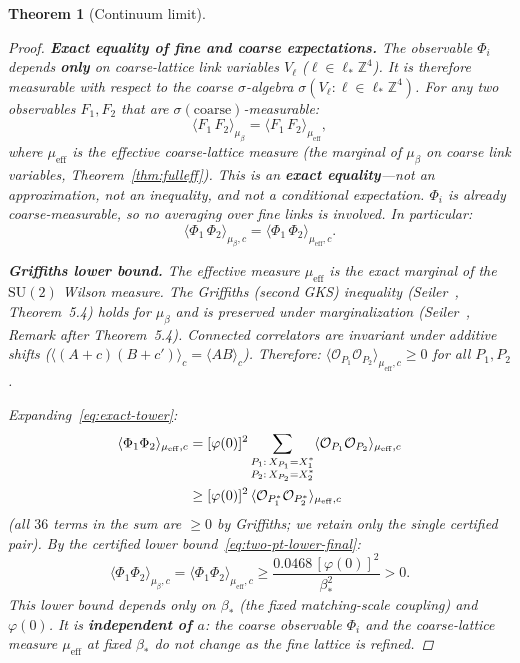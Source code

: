 \documentclass[11pt]{article}
\newtheorem{theorem}{Theorem}[section]
\theoremstyle{definition}
\newcommand{\SU}{\mathrm{SU}}
\newcommand{\Z}{\mathbb{Z}}
\begin{document}
\begin{theorem}[Continuum limit]
\begin{proof}
\textbf{Exact equality of fine and coarse expectations.}
The observable $\Phi_i$ depends \textbf{only} on
coarse-lattice link variables $V_\ell$
($\ell\in\ell_*\Z^4$).  It is therefore measurable with
respect to the coarse $\sigma$-algebra
$\sigma(V_\ell:\ell\in\ell_*\Z^4)$.
For any two observables $F_1,F_2$ that are
$\sigma(\text{coarse})$-measurable:
\begin{equation}\label{eq:coarse-measurable}
\langle F_1\,F_2\rangle_{\mu_\beta}
=\langle F_1\,F_2\rangle_{\mu_{\mathrm{eff}}},
\end{equation}
where $\mu_{\mathrm{eff}}$ is the effective coarse-lattice
measure (the marginal of $\mu_\beta$ on coarse link variables,
Theorem~\ref{thm:fulleff}).
This is an \textbf{exact equality}---not an approximation,
not an inequality, and not a conditional expectation.
$\Phi_i$ is already coarse-measurable, so no averaging
over fine links is involved.
In particular:
\begin{equation}\label{eq:exact-tower}
\langle\Phi_1\,\Phi_2\rangle_{\mu_\beta,c}
=\langle\Phi_1\,\Phi_2\rangle_{\mu_{\mathrm{eff}},c}.
\end{equation}

\textbf{Griffiths lower bound.}
The effective measure $\mu_{\mathrm{eff}}$ is the exact
marginal of the $\SU(2)$ Wilson measure.
The Griffiths (second GKS) inequality
(Seiler~\cite{Seiler82}, Theorem~5.4) holds for
$\mu_\beta$ and is preserved under
marginalization (Seiler~\cite{Seiler82}, Remark after
Theorem~5.4).  Connected correlators are invariant under
additive shifts ($\langle(A+c)(B+c')\rangle_c
=\langle AB\rangle_c$).  Therefore:
$\langle\mathcal{O}_{P_1}\mathcal{O}_{P_2}
\rangle_{\mu_{\mathrm{eff}},c}\ge 0$ for all $P_1,P_2$.

Expanding~\eqref{eq:exact-tower}:
\begin{align}
\langle\Phi_1\Phi_2\rangle_{\mu_{\mathrm{eff}},c}
&=[\varphi(0)]^2\sum_{\substack{P_1:\,X_{P_1}=X_1^*\\
P_2:\,X_{P_2}=X_2^*}}
\langle\mathcal{O}_{P_1}\mathcal{O}_{P_2}
\rangle_{\mu_{\mathrm{eff}},c}\notag\\
&\ge[\varphi(0)]^2\,
\langle\mathcal{O}_{P_1^*}\mathcal{O}_{P_2^*}
\rangle_{\mu_{\mathrm{eff}},c}
\label{eq:griffiths-drop}
\end{align}
(all $36$ terms in the sum are $\ge 0$ by Griffiths;
we retain only the single certified pair).
By the certified lower bound~\eqref{eq:two-pt-lower-final}:
\begin{equation}\label{eq:nontriviality-final}
\langle\Phi_1\Phi_2\rangle_{\mu_\beta,c}
=\langle\Phi_1\Phi_2\rangle_{\mu_{\mathrm{eff}},c}
\ge\frac{0.0468\,[\varphi(0)]^2}{\beta_*^2}>0.
\end{equation}
This lower bound depends only on $\beta_*$
(the fixed matching-scale coupling) and $\varphi(0)$.
It is \textbf{independent of $a$}: the coarse observable
$\Phi_i$ and the coarse-lattice measure $\mu_{\mathrm{eff}}$
at fixed $\beta_*$ do not change as the fine
lattice is refined.
\end{proof}


\end{theorem}
\end{document}
